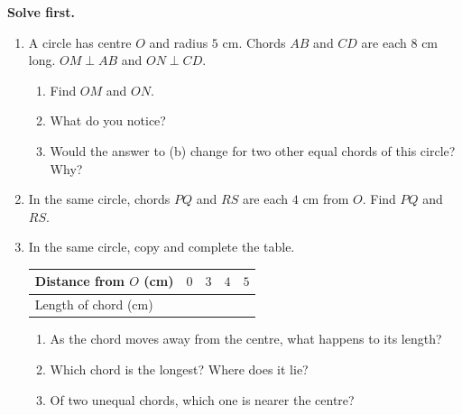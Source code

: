 \documentclass[11pt,a4paper]{article}
\theoremstyle{branddef}
\newcounter{prob}
\newenvironment{solvefirst}
  {\par\smallskip\noindent\textbf{Solve first.}
   \begin{enumerate}[label=\textbf{P\arabic*.},leftmargin=2.2em,itemsep=3pt,start=\numexpr\value{prob}+1\relax]}
  {\setcounter{prob}{\value{enumi}}\end{enumerate}}
\begin{document}
\begin{solvefirst}
  \item A circle has centre $O$ and radius $5$ cm. Chords $AB$ and $CD$ are each $8$ cm long. $OM\perp AB$ and $ON\perp CD$.
  \begin{enumerate}[label=(\alph*),itemsep=1pt]
    \item Find $OM$ and $ON$.
    \item What do you notice?
    \item Would the answer to (b) change for two other equal chords of this circle? Why?
  \end{enumerate}
  \item In the same circle, chords $PQ$ and $RS$ are each $4$ cm from $O$. Find $PQ$ and $RS$.
  \item In the same circle, copy and complete the table.
  \begin{center}
  \begin{tabular}{|l|c|c|c|c|}\hline
  Distance from $O$ (cm) & $0$ & $3$ & $4$ & $5$\\ \hline
  Length of chord (cm) & & & & \\ \hline
  \end{tabular}
  \end{center}
  \begin{enumerate}[label=(\alph*),itemsep=1pt]
    \item As the chord moves away from the centre, what happens to its length?
    \item Which chord is the longest? Where does it lie?
    \item Of two unequal chords, which one is nearer the centre?
  \end{enumerate}
\end{solvefirst}
\end{document}
